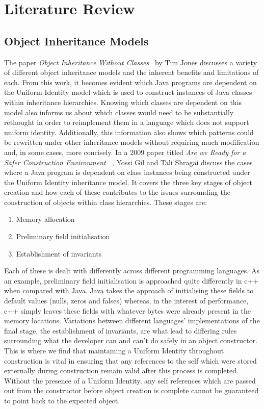 \chapter{Literature Review}\label{C:us}
\section{Object Inheritance Models}
The paper \textit{Object Inheritance Without Classes~\cite{InheritanceWithoutClasses}} by Tim Jones discusses a variety of different object inheritance models and the inherent benefits and limitations of each. From this work, it becomes evident which Java programs are dependent on the Uniform Identity model which is used to construct instances of Java classes within inheritance hierarchies. Knowing which classes are dependent on this model also informs us about which classes would need to be substantially rethought in order to reimplement them in a language which does not support uniform identity. Additionally, this information also shows which patterns could be rewritten under other inheritance models without requiring much modification and, in some cases, more concisely.
\newline
\newline
In a 2009 paper titled \textit{Are we Ready for a Safer Construction Environment ~\cite{SaferConstruction}}, Yossi Gil and Tali Shragai discuss the cases where a Java program is dependent on class instances being constructed under the Uniform Identity inheritance model. It covers the three key stages of object creation and how each of these contributes to the issues surrounding the construction of objects within class hierarchies. These stages are:
\begin{enumerate}
	\item Memory allocation
	\item Preliminary field initialisation
	\item Establishment of invariants
\end{enumerate}
Each of these is dealt with differently across different programming languages. As an example, preliminary field initialisation is approached quite differently in c++ when compared with Java. Java takes the approach of initialising these fields to default values (nulls, zeros and falses) whereas, in the interest of performance, c++ simply leaves these fields with whatever bytes were already present in the memory locations. \newline
Variations between different languages’ implementations of the final stage, the establishment of invariants, are what lead to differing rules surrounding what the developer can and can’t do safely in an object constructor. This is where we find that maintaining a Uniform Identity throughout construction is vital in ensuring that any references to the self which were stored externally during construction remain valid after this process is completed. Without the presence of a Uniform Identity, any self references which are passed out from the constructor before object creation is complete cannot be guaranteed to point back to the expected object. \newline
